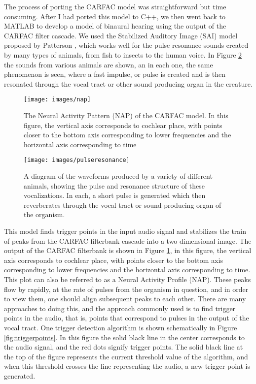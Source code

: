 The process of porting the CARFAC model was straightforward but time
consuming.  After I had ported this model to C++, we then went back to
MATLAB to develop a model of binaural hearing using the output of the
CARFAC filter cascade.  We used the Stabilized Auditory Image (SAI) model
proposed by Patterson \cite{patterson92}, which works well for the
pulse resonance sounds created by many types of animals, from fish to
insects to the human voice.  In Figure \ref{fig:pulseresonance} the
sounds from various animals are shown, an in each one, the same
phenomenon is seen, where a fast impulse, or pulse is created and is
then resonated through the vocal tract or other sound producing organ
in the creature.

\begin{figure}[t]
\begin{center}
\texttt{[image: images/nap]}
\caption{ The Neural Activity Pattern (NAP) of the CARFAC model.  In
  this figure, the vertical axis corresponds to cochlear place, with
  points closer to the bottom axis corresponding to lower frequencies
  and the horizontal axis corresponding to time}
\label{fig:nap} 
\end{center} 
\end{figure} 

\begin{figure}[t]
\begin{center}
\texttt{[image: images/pulseresonance]}
\caption{ A diagram of the waveforms produced by a variety of
  different animals, showing the pulse and resonance structure of
  these vocalizations.  In each, a short pulse is generated which then
  reverberates through the vocal tract or sound producing organ of the
  organism.}
\label{fig:pulseresonance} 
\end{center} 
\end{figure} 

This model finds trigger points in the input audio signal and
stabilizes the train of peaks from the CARFAC filterbank cascade into
a two dimensional image.  The output of the CARFAC filterbank is shown
in Figure \ref{fig:nap}, in this figure, the vertical axis corresponds
to cochlear place, with points closer to the bottom axis corresponding
to lower frequencies and the horizontal axis corresponding to time.
This plot can also be referred to as a Neural Activity Profile (NAP).
These peaks flow by rapidly, at the rate of pulses from the organism
in question, and in order to view them, one should align subsequent
peaks to each other.  There are many approaches to doing this, and the
approach commonly used is to find trigger points in the audio, that
is, points that correspond to pulses in the output of the vocal tract.
One trigger detection algorithm is shown schematically in Figure
\ref{fig:triggerpoints}.  In this figure the solid black line in the
center corresponds to the audio signal, and the red dots signify
trigger points.  The solid black line at the top of the figure
represents the current threshold value of the algorithm, and when this
threshold crosses the line representing the audio, a new trigger point
is generated.

